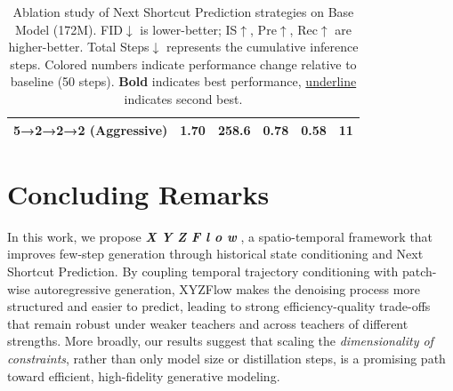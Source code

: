 \documentclass{article}
\theoremstyle{plain}
\theoremstyle{definition}
\theoremstyle{remark}
\newcommand{\XYZFlow}{%
    \textcolor{blue!40!purple!60}{X}%
    \textcolor{cyan!40!green!50}{Y}%
    \textcolor{yellow!40!orange}{Z}%
    \textcolor{blue!65!black}{F}%
    \textcolor{cyan!60!black}{l}%
    \textcolor{green!55!black}{o}%
    \textcolor{yellow!65!black}{w}%
}
\begin{document}
\begin{table}[h]
\begin{tabular}{@{}lccccc@{}}
5→2→2→2 (Aggressive) & 1.70{\color{red}{\tiny\(\downarrow\)0.02}} & 258.6{\color{blue}{\tiny\(\downarrow\)21.8}} & 0.78{\color{blue}{\tiny\(\downarrow\)0.04}} & 0.58{\color{blue}{\tiny\(\downarrow\)0.01}} & 11{\color{red}{\tiny\(\downarrow\)189}} \\
\bottomrule
\end{tabular}
\caption{Ablation study of Next Shortcut Prediction strategies on Base Model (172M). FID$\downarrow$ is lower-better; IS$\uparrow$, Pre$\uparrow$, Rec$\uparrow$ are higher-better. Total Steps$\downarrow$ represents the cumulative inference steps. Colored numbers indicate performance change relative to baseline (50 steps). \textbf{Bold} indicates best performance, \underline{underline} indicates second best.}
\label{tab:shortcut_ablation_base}
\vspace{-1.75mm}
\end{table}





\vspace{-7mm}
\section{Concluding Remarks}
\label{sec:conclusion}
\vspace{-2mm}
In this work, we propose \textbf{\emph{\XYZFlow}}, a spatio-temporal framework that improves few-step generation through historical state conditioning and Next Shortcut Prediction. By coupling temporal trajectory conditioning with patch-wise autoregressive generation, XYZFlow makes the denoising process more structured and easier to predict, leading to strong efficiency-quality trade-offs that remain robust under weaker teachers and across teachers of different strengths. More broadly, our results suggest that scaling the \textit{dimensionality of constraints}, rather than only model size or distillation steps, is a promising path toward efficient, high-fidelity generative modeling.
\end{document}

